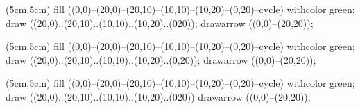 \documentclass[a4paper,fleqn]{article}
\begin{document}
\begin{empfile}[milderrorfig]
  \begin{empdef}[milderrorfig](5cm,5cm)
    fill ((0,0)--(20,0)--(20,10)--(10,10)--(10,20)--(0,20)--cycle)
        withcolor green;
    draw ((20,0)..(20,10)..(10,10)..(10,20)..(020));
    drawarrow ((0,0)--(20,20));
  \end{empdef}
\end{empfile}

\begin{empfile}[testfig]
  \begin{empdef}[testfig](5cm,5cm)
    fill ((0,0)--(20,0)--(20,10)--(10,10)--(10,20)--(0,20)--cycle)
        withcolor green;
    draw ((20,0)..(20,10)..(10,10)..(10,20)..(0,20));
    drawarrow ((0,0)--(20,20));
  \end{empdef}
\end{empfile}

\begin{empfile}[errorfig]
  \begin{empdef}[errorfig](5cm,5cm)
    fill ((0,0)--(20,0)--(20,10)--(10,10)--(10,20)--(0,20)--cycle)
        withcolor green;
    draw ((20,0)..(20,10)..(10,10)..(10,20)..(020))
    drawarrow ((0,0)--(20,20));
  \end{empdef}
\end{empfile}



\end{document}
